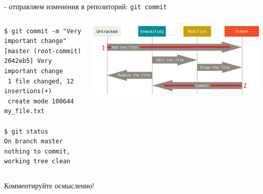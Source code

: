 \documentclass[presentation]{beamer}
\begin{document}
\begin{frame}[fragile,label={sec:org83efbe3}]{- отправляем изменения в репозиторий:}
 \alert{\texttt{git commit}}

\begin{columns}
\begin{column}{0.65\columnwidth}
\begin{verbatim}
$ git commit -m "Very important change"
[master (root-commit) 2642eb5] Very important change
 1 file changed, 12 insertions(+)
 create mode 100644 my_file.txt

$ git status
On branch master
nothing to commit, working tree clean
\end{verbatim}
\end{column}

\begin{column}{0.35\columnwidth}
\begin{center}
\includegraphics[width=0.98\textwidth]{./01_vcs_01_git_file_states_01_add.png}
\end{center}
\end{column}
\end{columns}
\end{frame}

\begin{frame}[label={sec:org9acb511}]{ Комментируйте осмысленно!}

\end{frame}
\end{document}
